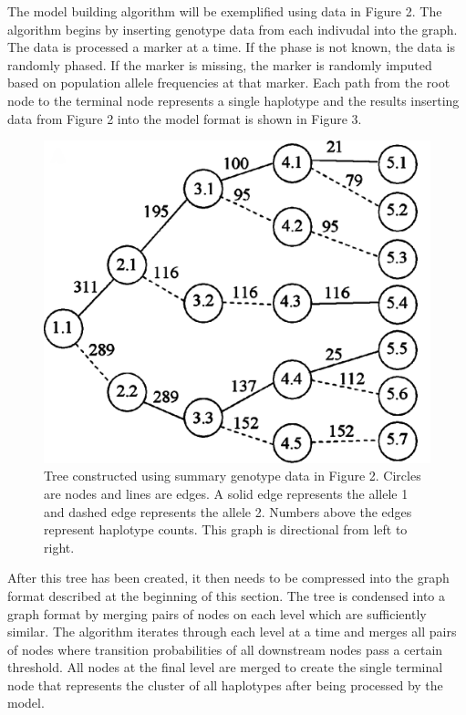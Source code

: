 \documentclass[a4paper,10pt,twoside,abstraction,titlepage]{article}
\begin{document}
\noindent The model building algorithm will be exemplified using data in Figure 2.   The algorithm begins by inserting genotype data from each indivudal into the graph.  The data is processed a marker at a time.  If the phase is not known, the data is randomly phased.  If the marker is missing, the marker is randomly imputed based on population allele frequencies at that marker.  Each path from the root node to the terminal node represents a single haplotype and the results inserting data from Figure 2 into the model format is shown in Figure 3.

\begin{figure}[htp!]
\vspace{10pt}
\begin{center}
\centerline{\includegraphics[scale=0.08]{fig3}}
\vspace{2pt}
\caption{Tree constructed using summary genotype data in Figure 2. Circles are nodes and lines are edges. A solid edge represents the allele 1 and dashed edge represents the allele 2. Numbers above the edges represent haplotype counts.  This graph is directional from left to right. \cite{beagle1}}

\end{center}
\vspace{-25pt}
\end{figure}


After this tree has been created, it then needs to be compressed into the graph format described at the beginning of this section.  The tree is condensed into a graph format by merging pairs of nodes on each level which are sufficiently similar.  The algorithm iterates through each level at a time and merges all pairs of nodes where transition probabilities of all downstream nodes pass a certain threshold.  All nodes at the final level are merged to create the single terminal node that represents the cluster of all haplotypes after being processed by the model.
\end{document}
